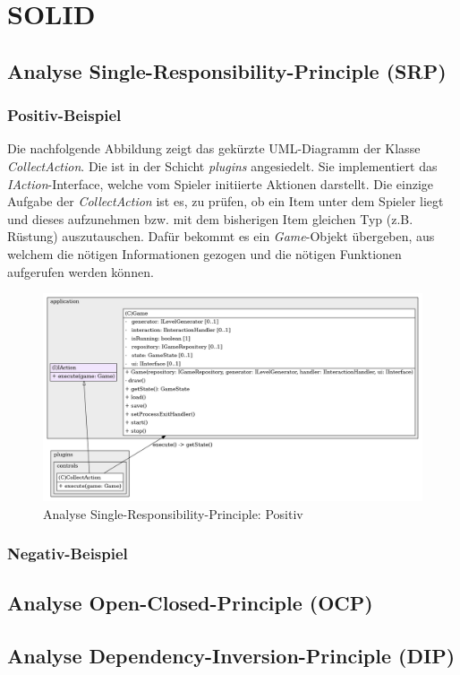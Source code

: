 \chapter{SOLID}

\section{Analyse Single-Responsibility-Principle (SRP)}
\subsection{Positiv-Beispiel}
Die nachfolgende Abbildung zeigt das gekürzte UML-Diagramm der Klasse
\textit{CollectAction}. Die ist in der Schicht \textit{plugins}
angesiedelt. Sie implementiert das \textit{IAction}-Interface, welche
vom Spieler initiierte Aktionen darstellt. Die einzige Aufgabe der
\textit{CollectAction} ist es, zu prüfen, ob ein Item unter dem 
Spieler liegt und dieses aufzunehmen bzw. mit dem bisherigen Item
gleichen Typ (z.B. Rüstung) auszutauschen. Dafür bekommt es ein
\textit{Game}-Objekt übergeben, aus welchem die nötigen Informationen
gezogen und die nötigen Funktionen aufgerufen werden können.

\vspace{0.5cm}
\begin{figure}[H]
    \centering
    \includegraphics[width=1\linewidth]{Bilder/Visualisierung/CollectActionSimplified_structure.png}
    \caption{Analyse Single-Responsibility-Principle: Positiv}
\end{figure}

\subsection{Negativ-Beispiel}

\section{Analyse Open-Closed-Principle (OCP)}

\section{Analyse Dependency-Inversion-Principle (DIP)}